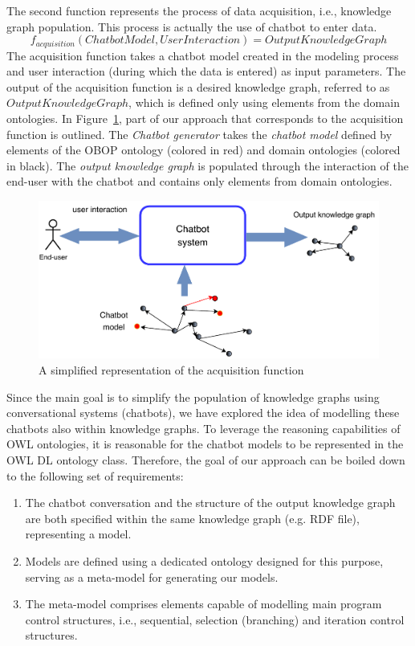 \documentclass[runningheads]{llncs}
\begin{document}
The second function represents the process of data acquisition, i.e., knowledge graph population. This process is actually the use of chatbot to enter data.
$$f_{acquisition}(ChatbotModel, UserInteraction) = OutputKnowledgeGraph$$
The acquisition function takes a chatbot model created in the modeling process and user interaction (during which the data is entered) as input parameters. The output of the acquisition function is a desired knowledge graph, referred to as $OutputKnowledgeGraph$, which is defined only using elements from the domain ontologies. In Figure~\ref{fig:chatbotsystem}, part of our approach that corresponds to the acquisition function is outlined. The \textit{Chatbot generator} takes the \textit{chatbot model} defined by elements of the OBOP ontology (colored in red) and domain ontologies (colored in black). The \textit{output knowledge graph} is populated through the interaction of the end-user with the chatbot and contains only elements from domain ontologies.
\begin{figure}[H]
  \centering
  \includegraphics[width=0.9\linewidth]{img/chatbot-system}
  \caption{A simplified representation of the acquisition function}
  \label{fig:chatbotsystem}
\end{figure}
Since the main goal is to simplify the population of knowledge graphs using conversational systems (chatbots), we have explored the idea of modelling these chatbots also within knowledge graphs. To leverage the reasoning capabilities of OWL ontologies, it is reasonable for the chatbot models to be represented in the OWL DL ontology class. Therefore, the goal of our approach can be boiled down to the following set of requirements:
\begin{enumerate}
\item
  The chatbot conversation and the structure of the output knowledge graph are both specified within the same knowledge graph (e.g. RDF file), representing a model.
\item
  Models are defined using a dedicated ontology designed for this purpose, serving as a meta-model for generating our models.
\item
The meta-model comprises elements capable of modelling main program control structures, i.e., sequential, selection (branching) and iteration control structures. 
\end{enumerate}
\end{document}
